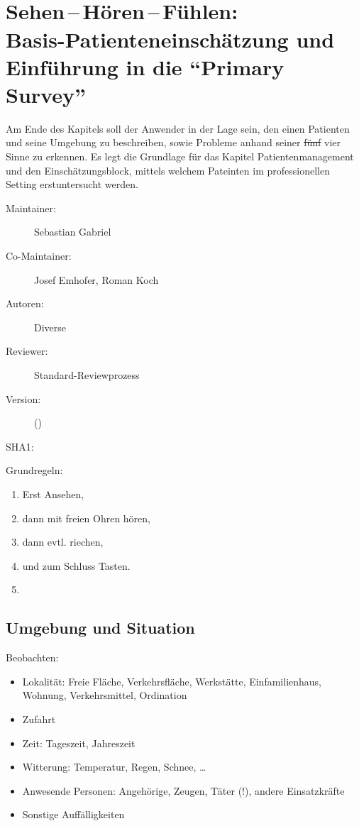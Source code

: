 \chapter
[\CO{[SHF]} Sehen\,--\,Hören\,--\,Fühlen]
{\CC{[SHF]}\\Sehen\,--\,Hören\,--\,Fühlen:\\Basis-Patienteneinschätzung und Einführung in die \enquote{Primary Survey}}
\label{chp:BET}

\ChapterIntro
{%
Am Ende des Kapitels soll der Anwender in der Lage sein,
den einen Patienten und seine Umgebung zu beschreiben, sowie
Probleme anhand seiner \sout{fünf} vier Sinne zu erkennen.
Es legt die Grundlage für das Kapitel Patientenmanagement und den
Einschätzungsblock, mittels welchem Pateinten im
professionellen Setting erstuntersucht werden.

}{%
\begin{description}
  \item[Maintainer:] Sebastian Gabriel
  \item[Co-Maintainer:] Josef Emhofer, Roman Koch
  \item[Autoren:] Diverse
  \item[Reviewer:] Standard-Reviewprozess
  \item[Version:] {\DocVersion} ({\DocVersionInfo})
  \item[SHA1:] {\DocGitCommit}
\end{description}

{\TxTeilkapitelAASS}
}

Grundregeln:

\begin{enumerate}
  \item Erst Ansehen,
  \item dann mit freien Ohren hören,
  \item dann evtl. riechen,
  \item und zum Schluss Tasten.
  \item {}
\end{enumerate}


\section{Umgebung und Situation}

Beobachten:

\begin{itemize}
  \item Lokalität: Freie Fläche, Verkehrsfläche, Werkstätte,
  Einfamilienhaus, Wohnung, Verkehrsmittel, Ordination
  \item Zufahrt
  \item Zeit: Tageszeit, Jahreszeit
  \item Witterung: Temperatur, Regen, Schnee, \ldots
  \item Anwesende Personen: Angehörige, Zeugen, Täter (!),
  andere Einsatzkräfte
  \item Sonstige Auffälligkeiten
\end{itemize}

